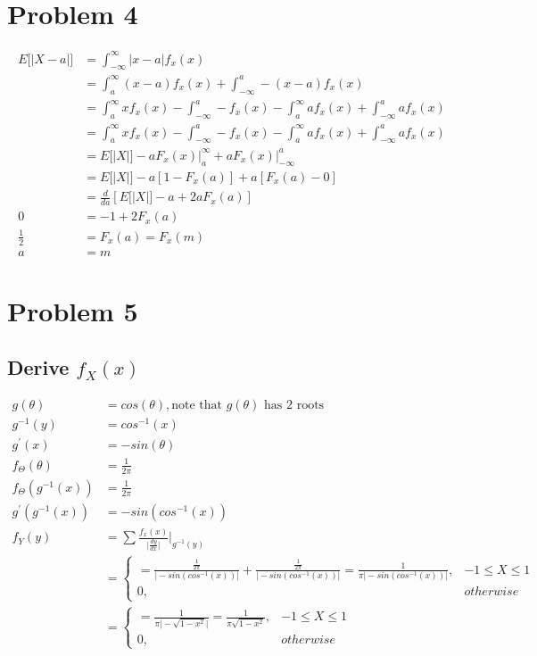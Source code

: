 \documentclass[12pt]{article}
\begin{document}
\section*{Problem 4}
\begin{align*}
  E\Big[|X-a|\Big] &= \int_{-\infty}^\infty |x-a| f_x(x) \\
  &= \int_{a}^\infty (x-a) f_x(x) + \int_{-\infty}^a -(x-a) f_x(x)\\
  &= \int_{a}^\infty x f_x(x) - \int_{-\infty}^a - f_x(x) - 
  \int_{a}^\infty a f_x(x) + \int_{-\infty}^a  a f_x(x)\\
  &= \int_{a}^\infty x f_x(x) - \int_{-\infty}^a - f_x(x) - 
  \int_{a}^\infty a f_x(x) + \int_{-\infty}^a  a f_x(x)\\
  &= E\Big[|X|\Big] - a F_x(x)\big|_a^\infty + a F_x(x)\big|_{-\infty}^a \\
  &= E\Big[|X|\Big] - a[1 - F_x(a)] + a[F_x(a) - 0] \\
  &= \frac{d}{da}\left[E\Big[|X|\Big] - a + 2aF_x(a)\right] \\
  0 &= -1 + 2F_x(a) \\
  \frac{1}{2} &= F_x(a) = F_x(m) \\
  a &= m
\end{align*}

\section*{Problem 5}
\subsection*{Derive $f_X(x)$ }
\begin{align*}
  g(\theta) &= cos(\theta), \textrm{note that $g(\theta)$ has 2 roots} \\
  g^{-1}(y) &= cos^{-1}(x) \\
  g^{'}(x) &= -sin(\theta) \\
  f_\Theta(\theta) &= \frac{1}{2\pi} \\
  f_\Theta(g^{-1}(x)) &= \frac{1}{2\pi} \\
  g^{'}(g^{-1}(x)) &= -sin(cos^{-1}(x)) \\
  f_Y(y) &= \sum \frac{f_x(x)}{\big|\frac{dy}{dx}\big|}\Bigg|_{g^{-1}(y)} \\
  &= \begin{cases}
    = \frac{\frac{1}{2\pi}}{\big|-sin(cos^{-1}(x))\big|} +
      \frac{\frac{1}{2\pi}}{\big|-sin(cos^{-1}(x))\big|}
    = \frac{1}{\pi\big|-sin(cos^{-1}(x))\big|}, & -1\leq X \leq 1 \\
    0, & otherwise
  \end{cases} \\
  &= \begin{cases}
    = \frac{1}{\pi\big|-\sqrt{1-x^2}\big|}
    = \frac{1}{\pi\sqrt{1-x^2}}, & -1\leq X \leq 1 \\
    0, & otherwise
  \end{cases}
\end{align*}
\end{document}
